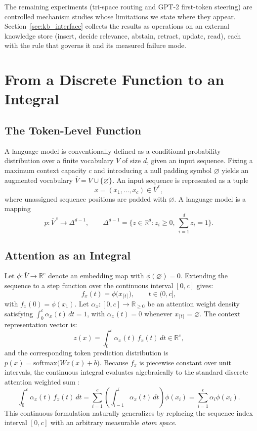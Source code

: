 \documentclass[preprint,12pt]{elsarticle}
\newcommand{\R}{\mathbb{R}}
\newcommand{\V}{V}
\newcommand{\VBar}{\bar{V}}
\newif\ifmarkchanges
\newcommand{\revii}[1]{\ifmarkchanges{\color{blue}#1}\else#1\fi}
\begin{document}
The remaining experiments (tri-space routing and GPT-2 first-token steering) are controlled mechanism studies whose limitations we state where they appear. \revii{Section~\ref{sec:kb_interface} collects the results as operations on an external knowledge store (insert, decide relevance, abstain, retract, update, read), each with the rule that governs it and its measured failure mode.}

\section{From a Discrete Function to an Integral}
\label{sec:discrete_to_integral}

\subsection{The Token-Level Function}

A language model is conventionally defined as a conditional probability distribution over a finite vocabulary $\V$ of size $d$, given an input sequence. Fixing a maximum context capacity $c$ and introducing a null padding symbol $\varnothing$ yields an augmented vocabulary $\VBar = \V \cup \{\varnothing\}$. An input sequence is represented as a tuple
\[
  x = (x_1, \dots, x_c) \in \VBar^{\,c},
\]
where unassigned sequence positions are padded with $\varnothing$. A language model is a mapping
\[
  p : \VBar^{\,c} \to \Delta^{d-1}, \qquad
  \Delta^{d-1} = \Big\{ z \in \R^d : z_i \ge 0,\ \sum_{i=1}^d z_i = 1 \Big\}.
\]

\subsection{Attention as an Integral}

Let $\phi : \VBar \to \R^{e}$ denote an embedding map with $\phi(\varnothing) = 0$. Extending the sequence to a step function over the continuous interval $[0,c]$ gives:
\[
  f_x(t) = \phi\big(x_{\lceil t \rceil}\big), \qquad t \in (0,c],
\]
with $f_x(0) = \phi(x_1)$. Let $\alpha_x : [0,c] \to \R_{\ge 0}$ be an attention weight density satisfying $\int_0^c \alpha_x(t)\,dt = 1$, with $\alpha_x(t) = 0$ whenever $x_{\lceil t \rceil} = \varnothing$. The context representation vector is:
\[
  z(x) = \int_0^c \alpha_x(t)\, f_x(t)\, dt \in \R^e,
\]
and the corresponding token prediction distribution is $p(x) = \mathrm{softmax}\big( W z(x) + b \big)$.
Because $f_x$ is piecewise constant over unit intervals, the continuous integral evaluates algebraically to the standard discrete attention weighted sum \cite{vaswani2017attention, martins2020sparse}:
\[
  \int_0^c \alpha_x(t)\, f_x(t)\, dt = \sum_{i=1}^c \left( \int_{i-1}^i \alpha_x(t)\, dt \right) \phi(x_i) = \sum_{i=1}^c \alpha_i \phi(x_i).
\]
This continuous formulation naturally generalizes by replacing the sequence index interval $[0,c]$ with an arbitrary measurable \emph{atom space}.
\end{document}
